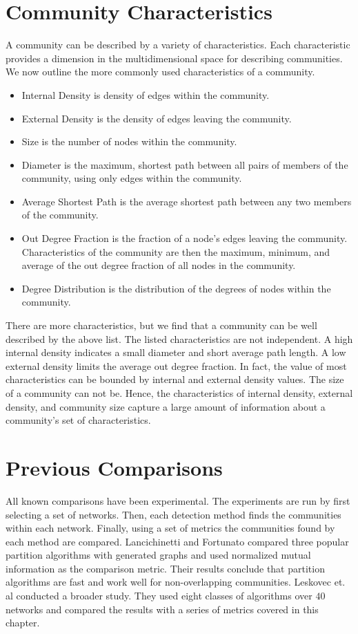 \documentclass[phd,tocprelim]{cornell}
\begin{document}
\section{Community Characteristics}

A community can be described by a variety of characteristics.  Each characteristic provides a dimension in the multidimensional space for describing communities.  We now outline the more commonly used characteristics of a community.
\begin{itemize}
\item {\sc Internal Density} is density of edges within the community.
\item {\sc External Density} is the density of edges leaving the community.
\item {\sc Size} is the number of nodes within the community.
\item {\sc Diameter} is the maximum, shortest path between all pairs of members of the community, using only edges within the community.
\item {\sc Average Shortest Path} is the average shortest path between any two members of the community.
\item {\sc Out Degree Fraction} is the fraction of a node's edges leaving the community.  Characteristics of the community are then the maximum, minimum, and average of the out degree fraction of all nodes in the community.
\item {\sc Degree Distribution} is the distribution of the degrees of nodes within the community.
\end{itemize}
There are more characteristics, but we find that a community can be well described by the above list.  The listed characteristics are not independent.  A high internal density indicates a small diameter and short average path length.  A low external density limits the average out degree fraction.  In fact, the value of most characteristics can be bounded by internal and external density values.  The size of a community can not be.  Hence, the characteristics of internal density, external density, and community size capture a large amount of information about a community's set of characteristics.


\section{Previous Comparisons}

All known comparisons have been experimental.  The experiments are run by first selecting a set of networks.  Then, each detection method finds the communities within each network.  Finally, using a set of metrics the communities found by each method are compared.  Lancichinetti and Fortunato \cite{lanc:2009} compared three popular partition algorithms with generated graphs and used normalized mutual information as the comparison metric.  Their results conclude that partition algorithms are fast and work well for non-overlapping communities.  Leskovec et. al \cite{leskovec} conducted a broader study.  They used eight classes of algorithms over $40$ networks and compared the results with a series of metrics covered in this chapter.
\end{document}
